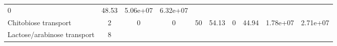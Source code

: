 \documentclass[]{article}
\begin{document}
\begin{longtable}[]{@{}lccccccccc@{}}
\begin{minipage}[t]{0.08\columnwidth}
0\strut
\end{minipage} & \begin{minipage}[t]{0.08\columnwidth}\centering\strut
48.53\strut
\end{minipage} & \begin{minipage}[t]{0.08\columnwidth}\centering\strut
5.06e+07\strut
\end{minipage} & \begin{minipage}[t]{0.08\columnwidth}\centering\strut
6.32e+07\strut
\end{minipage}\tabularnewline
\begin{minipage}[t]{0.07\columnwidth}\raggedright\strut
Chitobiose transport\strut
\end{minipage} & \begin{minipage}[t]{0.06\columnwidth}\centering\strut
2\strut
\end{minipage} & \begin{minipage}[t]{0.08\columnwidth}\centering\strut
0\strut
\end{minipage} & \begin{minipage}[t]{0.08\columnwidth}\centering\strut
0\strut
\end{minipage} & \begin{minipage}[t]{0.08\columnwidth}\centering\strut
50\strut
\end{minipage} & \begin{minipage}[t]{0.08\columnwidth}\centering\strut
54.13\strut
\end{minipage} & \begin{minipage}[t]{0.08\columnwidth}\centering\strut
0\strut
\end{minipage} & \begin{minipage}[t]{0.08\columnwidth}\centering\strut
44.94\strut
\end{minipage} & \begin{minipage}[t]{0.08\columnwidth}\centering\strut
1.78e+07\strut
\end{minipage} & \begin{minipage}[t]{0.08\columnwidth}\centering\strut
2.71e+07\strut
\end{minipage}\tabularnewline
\begin{minipage}[t]{0.07\columnwidth}\raggedright\strut
Lactose/arabinose transport\strut
\end{minipage} & \begin{minipage}[t]{0.06\columnwidth}\centering\strut
8\strut
\end{minipage} & \begin{minipage}[t]{0.08\columnwidth}\centering\strut

\end{minipage}
\end{longtable}
\end{document}
